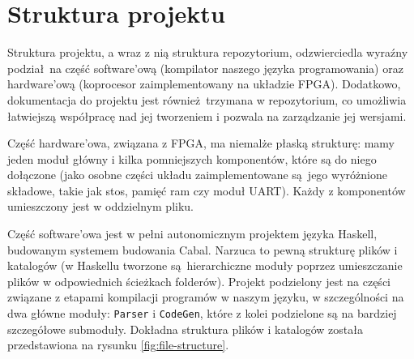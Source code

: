 \section{Struktura projektu}

Struktura projektu, a wraz z nią struktura repozytorium, odzwierciedla wyraźny podział na część software'ową (kompilator naszego języka programowania) oraz hardware'ową (koprocesor zaimplementowany na układzie FPGA). Dodatkowo, dokumentacja do projektu jest również trzymana w repozytorium, co umożliwia łatwiejszą współpracę nad jej tworzeniem i pozwala na zarządzanie jej wersjami.

Część hardware'owa, związana z FPGA, ma niemalże płaską strukturę: mamy jeden moduł główny i kilka pomniejszych komponentów, które są do niego dołączone (jako osobne części układu zaimplementowane są jego wyróżnione składowe, takie jak stos, pamięć ram czy moduł UART). Każdy z komponentów umieszczony jest w oddzielnym pliku.

Część software'owa jest w pełni autonomicznym projektem języka Haskell, budowanym systemem budowania Cabal. Narzuca to pewną strukturę plików i katalogów (w Haskellu tworzone są hierarchiczne moduły poprzez umieszczanie plików w odpowiednich ścieżkach folderów). Projekt podzielony jest na części związane z etapami kompilacji programów w naszym języku, w szczególności na dwa główne moduły: \texttt{Parser} i \texttt{CodeGen}, które z kolei podzielone są na bardziej szczegółowe submoduły. Dokładna struktura plików i katalogów została przedstawiona na rysunku \ref{fig:file-structure}.

